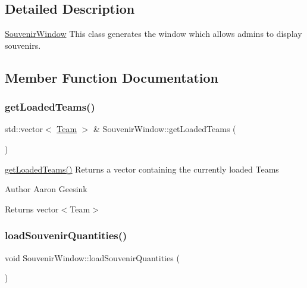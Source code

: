 \subsection{Detailed Description}
\mbox{\hyperlink{class_souvenir_window}{Souvenir\+Window}} This class generates the window which allows admins to display souvenirs. 

\subsection{Member Function Documentation}
\mbox{\label{class_souvenir_window_a7986e93d5b36524ff45b4218baa26abe}} 
\subsubsection{\texorpdfstring{getLoadedTeams()}{getLoadedTeams()}}
{\footnotesize\ttfamily std\+::vector$<$ \mbox{\hyperlink{class_team}{Team}} $>$ \& Souvenir\+Window\+::get\+Loaded\+Teams (\begin{DoxyParamCaption}{ }\end{DoxyParamCaption})}



\mbox{\hyperlink{class_souvenir_window_a7986e93d5b36524ff45b4218baa26abe}{get\+Loaded\+Teams()}} Returns a vector containing the currently loaded Teams 

\begin{DoxyAuthor}{Author}
Aaron Geesink 
\end{DoxyAuthor}
\begin{DoxyReturn}{Returns}
vector$<$\+Team$>$ 
\end{DoxyReturn}
\mbox{\label{class_souvenir_window_a1c004a0549aeb3b18269f1330c23168e}} 
\subsubsection{\texorpdfstring{loadSouvenirQuantities()}{loadSouvenirQuantities()}}
{\footnotesize\ttfamily void Souvenir\+Window\+::load\+Souvenir\+Quantities (\begin{DoxyParamCaption}{ }\end{DoxyParamCaption})}



